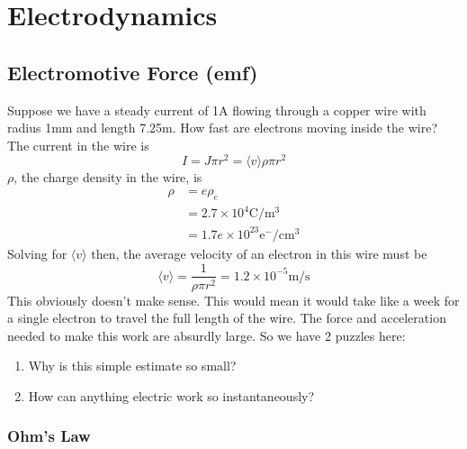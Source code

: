\documentclass[a4paper]{article}
\begin{document}
\section{Electrodynamics}
\subsection{Electromotive Force (emf)}
Suppose we have a steady current of 1A flowing through a copper wire with
radius 1mm and length 7.25m. How fast are electrons moving inside the wire?
The current in the wire is
\[ I = J\pi r^2 = \langle v\rangle\rho\pi r^2 \]
$\rho$, the charge density in the wire, is
\begin{align*}
	\rho &= e\rho_e\\
	     &= 2.7\times 10^4 \mathrm{C/m^3}\\
	     &= 1.7e\times10^{23} \mathrm{e^-/cm^3}
\end{align*}
Solving for $\langle v\rangle$ then, the average velocity of an electron in
this wire must be
\[ \langle v\rangle = \frac{1}{\rho\pi r^2} = 1.2\times10^{-5} \mathrm{m/s} \]
This obviously doesn't make sense. This would mean it would take like a week
for a single electron to travel the full length of the wire. The force and
acceleration needed to make this work are absurdly large. So we have
2 puzzles here:
\begin{enumerate}
	\item Why is this simple estimate so small?
	\item How can anything electric work so instantaneously?
\end{enumerate}
\subsubsection{Ohm's Law}
\end{document}

